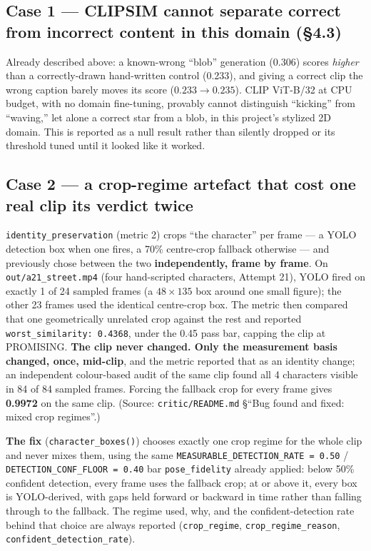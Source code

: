\documentclass[11pt]{article}
\newcommand{\secsym}{\S}
\begin{document}
\subsection{Case 1 --- CLIPSIM cannot separate correct from incorrect content in this domain (\texorpdfstring{\secsym4.3}{4.3})}
\label{sec:case1}

Already described above: a known-wrong ``blob'' generation (0.306) scores
\emph{higher} than a correctly-drawn hand-written control (0.233), and
giving a correct clip the wrong caption barely moves its score ($0.233
\rightarrow 0.235$). CLIP ViT-B/32 at CPU budget, with no domain
fine-tuning, provably cannot distinguish ``kicking'' from ``waving,'' let
alone a correct star from a blob, in this project's stylized 2D domain.
This is reported as a null result rather than silently dropped or its
threshold tuned until it looked like it worked.

\subsection{Case 2 --- a crop-regime artefact that cost one real clip its verdict twice}
\label{sec:case2}

\texttt{identity\_preservation} (metric 2) crops ``the character'' per
frame --- a YOLO detection box when one fires, a 70\% centre-crop fallback
otherwise --- and previously chose between the two \textbf{independently,
frame by frame}. On \texttt{out/a21\_street.mp4} (four hand-scripted
characters, Attempt 21), YOLO fired on exactly 1 of 24 sampled frames (a
$48\times135$ box around one small figure); the other 23 frames used the
identical centre-crop box. The metric then compared that one
geometrically unrelated crop against the rest and reported
\texttt{worst\_similarity: 0.4368}, under the 0.45 pass bar, capping the
clip at PROMISING. \textbf{The clip never changed. Only the measurement
basis changed, once, mid-clip}, and the metric reported that as an
identity change; an independent colour-based audit of the same clip found
all 4 characters visible in 84 of 84 sampled frames. Forcing the fallback
crop for every frame gives \textbf{0.9972} on the same clip. (Source:
\texttt{critic/README.md} \secsym``Bug found and fixed: mixed crop
regimes''.)

\textbf{The fix} (\texttt{character\_boxes()}) chooses exactly one crop
regime for the whole clip and never mixes them, using the same
\texttt{MEASURABLE\_DETECTION\_RATE = 0.50} / \texttt{DETECTION\_CONF\_FLOOR
= 0.40} bar \texttt{pose\_fidelity} already applied: below 50\% confident
detection, every frame uses the fallback crop; at or above it, every box
is YOLO-derived, with gaps held forward or backward in time rather than
falling through to the fallback. The regime used, why, and the
confident-detection rate behind that choice are always reported
(\texttt{crop\_regime}, \texttt{crop\_regime\_reason},
\texttt{confident\_detection\_rate}).
\end{document}
